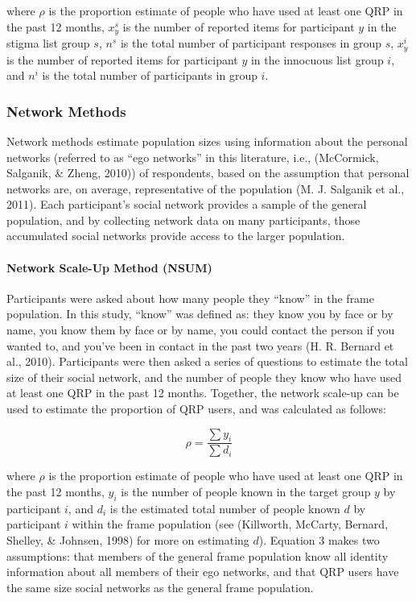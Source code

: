 \documentclass[jou]{apa6}
\let\oldparagraph\paragraph
\renewcommand{\paragraph}[1]{\oldparagraph{#1}\mbox{}}
\theoremstyle{definition}
\theoremstyle{definition}
\theoremstyle{definition}
\theoremstyle{remark}
\begin{document}
where \(\rho\) is the proportion estimate of people who have used at
least one QRP in the past 12 months, \(x_y^s\) is the number of reported
items for participant \(y\) in the stigma list group \(s\), \(n^s\) is
the total number of participant responses in group \(s\), \(x_y^i\) is
the number of reported items for participant \(y\) in the innocuous list
group \(i\), and \(n^i\) is the total number of participants in group
\(i\).

\subsubsection{Network Methods}\label{network-methods}

Network methods estimate population sizes using information about the
personal networks (referred to as \enquote{ego networks} in this
literature, i.e., (McCormick, Salganik, \& Zheng, 2010)) of respondents,
based on the assumption that personal networks are, on average,
representative of the population (M. J. Salganik et al., 2011). Each
participant's social network provides a sample of the general
population, and by collecting network data on many participants, those
accumulated social networks provide access to the larger population.

\paragraph{Network Scale-Up Method
(NSUM)}\label{network-scale-up-method-nsum}

Participants were asked about how many people they \enquote{know} in the
frame population. In this study, \enquote{know} was defined as: they
know you by face or by name, you know them by face or by name, you could
contact the person if you wanted to, and you've been in contact in the
past two years (H. R. Bernard et al., 2010). Participants were then
asked a series of questions to estimate the total size of their social
network, and the number of people they know who have used at least one
QRP in the past 12 months. Together, the network scale-up can be used to
estimate the proportion of QRP users, and was calculated as follows:

\begin{equation}
\rho = \frac{\sum y_i}{\sum d_i}
\end{equation}

where \(\rho\) is the proportion estimate of people who have used at
least one QRP in the past 12 months, \(y_i\) is the number of people
known in the target group \(y\) by participant \(i\), and \(d_i\) is the
estimated total number of people known \(d\) by participant \(i\) within
the frame population (see (Killworth, McCarty, Bernard, Shelley, \&
Johnsen, 1998) for more on estimating \(d\)). Equation 3 makes two
assumptions: that members of the general frame population know all
identity information about all members of their ego networks, and that
QRP users have the same size social networks as the general frame
population.
\end{document}
